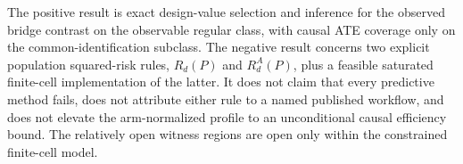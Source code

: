 The positive result is exact design-value selection and inference for the observed bridge contrast on the observable regular class, with causal ATE coverage only on the common-identification subclass. The negative result concerns two explicit population squared-risk rules, \(R_d(P)\) and \(R_d^A(P)\), plus a feasible saturated finite-cell implementation of the latter. It does not claim that every predictive method fails, does not attribute either rule to a named published workflow, and does not elevate the arm-normalized profile to an unconditional causal efficiency bound. The relatively open witness regions are open only within the constrained finite-cell model.